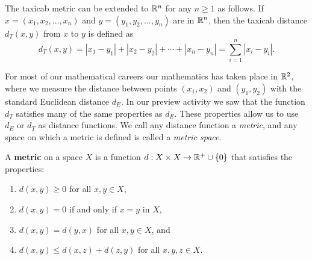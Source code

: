 \begin{comment}
\item A point $(x_1,x_2)$ will be a distance 1 from the origin if $|x_1| + |x_2| = 1$. This will only happen if 
\[|x_2| = 1- |x_1| \text{ and } -1 \leq x_1, x_2 \leq 1.\]
In other words, the point $(x_1,x_2)$ must lie on one of the lines 
\begin{align*}
x_2 &= 1-x_1 \text{ if } x_1, x_2 \geq 0 \\
x_2 &= 1+x_1 \text{ if } x_1<0 \text{ and } x_2 \geq 0 \\
x_2 &= -1+x_1 \text{ if } x_1\geq 0 \text{ and } x_2 < 0 \\
x_2 &= -1-x_1 \text{ if } x_1, x_2 \leq 0.
\end{align*}
So the unit circle using the metric $d_T$ in $\R^2$ looks as depicted in Figure \ref{F:taxicab_circle}.
\begin{figure}[ht]
\begin{center}
\resizebox{!}{2.0in}{\texttt{[image: Taxicab\_circle]}}
\end{center}
\caption{The unit circle in $\R^2$ using the taxicab metric.}
\label{F:taxicab_circle}
\end{figure}
	
\ee


\end{comment}

The taxicab metric can be extended to $\mathbb{R}^n$ for any $n \geq 1$ as follows. If $x = (x_1, x_2, \ldots, x_n)$ and $y = (y_1, y_2, \ldots, y_n)$ are in $\mathbb{R}^n$, then the taxicab distance $d_T(x,y)$ from $x$ to $y$ is defined as
\[d_T(x,y) = |x_1-y_1| + |x_2-y_2| + \cdots + |x_n-y_n| = \sum_{i=1}^n |x_i-y_i|.\]



For most of our mathematical careers our mathematics has taken place in $\mathbb{R}^2$, where we measure the distance between points $(x_1,x_2)$ and $(y_1,y_2)$ with the standard Euclidean distance $d_E$. In our preview activity we saw that the function $d_T$ satisfies many of the same properties as $d_E$. These properties allow us to use $d_E$ or $d_T$ as distance functions. We call any distance function a \emph{metric}, and any space on which a metric is defined is called a \emph{metric space}. 

\begin{definition} A \textbf{metric} on a space $X$ is a function $d : X \times X \to \mathbb{R}^+ \cup \{0\}$ that satisfies the properties: 
\begin{enumerate}
\item $d(x,y) \geq 0$ for all $x,y \in X$,
\item $d(x,y) = 0$ if and only if $x = y$ in $X$,
\item $d(x,y) = d(y,x)$ for all $x, y \in X$, and
\item $d(x,y) \leq d(x,z) + d(z,y)$ for all $x,y,z \in X$.
\end{enumerate}
\end{definition}

